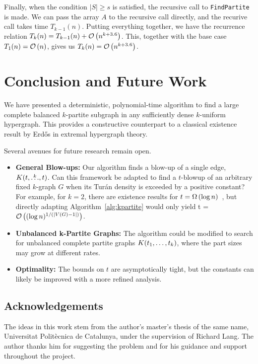 Finally, when the condition $|S| \geq s$ is satisfied, the recursive call to \texttt{FindPartite} is made.
We can pass the array $A$ to the recursive call directly, and the recurive call takes time $T_{k-1}(n)$.
Putting everything together, we have the recurrence relation $T_k(n) = T_{k-1}(n) + \mathcal{O}\left(n^{k+3.6}\right)$.
This, together with the base case $T_1(n) = \mathcal{O}\left(n\right)$, gives us $T_k(n) = \mathcal{O}\left(n^{k+3.6}\right)$.

\section{Conclusion and Future Work}\label{sec:conclusion-and-future-work}

We have presented a deterministic,
polynomial-time algorithm to find a large complete balanced $k$-partite subgraph in any sufficiently dense $k$-uniform hypergraph.
This provides a constructive counterpart to a classical existence result by Erd\H{o}s in extremal hypergraph theory.

Several avenues for future research remain open.
\begin{itemize}
    \item \textbf{General Blow-ups:} Our algorithm finds a blow-up of a single edge, $K(t, \overset{k}{\dots}, t)$.
    Can this framework be adapted to find a $t$-blowup of an arbitrary fixed $k$-graph $G$ when its Tur\'{a}n density is exceeded by a positive constant?
    For example, for $k=2$, there are existence results for $t = \Omega\left(\log n\right)$~\cite{bollobas1973structure}, but directly adapting Algorithm~\ref{alg:kpartite} would only
    yield t = $\mathcal{O}\left((\log n)^{1/(|V(G) - 1|)}\right)$.
    \item \textbf{Unbalanced k-Partite Graphs:} The algorithm could be modified to search for unbalanced complete partite graphs $K(t_1, \dots, t_k)$, where the part sizes may grow at different rates.
    \item \textbf{Optimality:} The bounds on $t$ are asymptotically tight, but the constants can likely be improved with a more refined analysis.
\end{itemize}

\subsection*{Acknowledgements}

The ideas in this work stem from the author's master's thesis of the same name,
Universitat Polit\`{e}cnica de Catalunya,
under the supervision of Richard Lang.
The author thanks him for suggesting the problem and for his guidance and support throughout the project.
